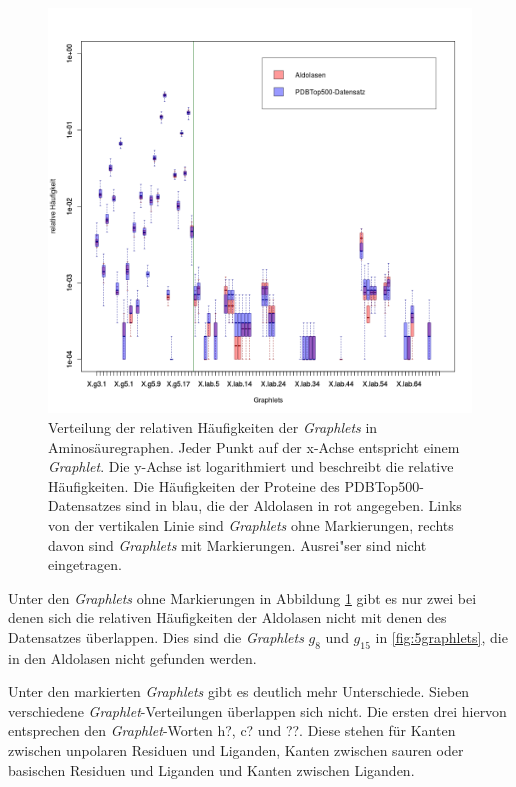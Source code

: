 \documentclass{report}
\begin{document}
\begin{figure}

\includegraphics[scale=0.55]{aa_plot.png}
\caption{Verteilung der relativen H\"aufigkeiten der \textit{Graphlets} in Aminos\"auregraphen. Jeder Punkt auf der x-Achse entspricht einem \textit{Graphlet}. Die y-Achse ist logarithmiert und beschreibt die relative H\"aufigkeiten. Die H\"aufigkeiten der Proteine des PDBTop500-Datensatzes sind in blau, die der Aldolasen in rot angegeben. Links von der vertikalen Linie sind \textit{Graphlets} ohne Markierungen, rechts davon sind \textit{Graphlets} mit Markierungen. Ausrei"ser sind nicht eingetragen.}
\label{fig:aaplot}
\end{figure}




Unter den \textit{Graphlets} ohne Markierungen in Abbildung \ref{fig:aaplot} gibt es nur zwei bei denen sich die relativen H\"aufigkeiten der Aldolasen nicht mit denen des Datensatzes \"uberlappen. Dies sind die \textit{Graphlets} $g_8$ und $g_{15}$ in \ref{fig:5graphlets}, die in den Aldolasen nicht gefunden werden.


Unter den markierten \textit{Graphlets} gibt es deutlich mehr Unterschiede. Sieben verschiedene \textit{Graphlet}-Verteilungen \"uberlappen sich nicht. Die ersten drei hiervon entsprechen den \textit{Graphlet}-Worten h?, c? und ??. Diese stehen f\"ur Kanten zwischen unpolaren Residuen und Liganden, Kanten zwischen sauren oder basischen Residuen und Liganden und Kanten zwischen Liganden.
\end{document}
